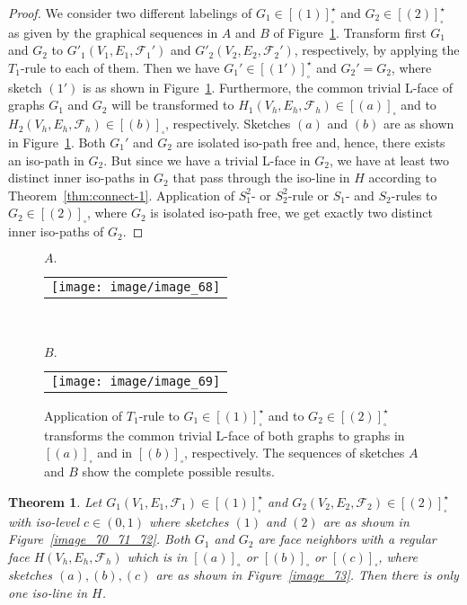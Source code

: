 \documentclass[a4paper,11pt]{article}
\newtheorem{theorem}{Theorem}[section]
\begin{document}
\begin{proof} We consider two different labelings of $G_1\in [(1)]_{\square}^{\star}$ and
$G_2\in [(2)]_{\square}^{\star}$ as given by the graphical sequences in $A$ and $B$ of
Figure~\ref{image_68_69}. Transform first $G_1$ and $G_2$ to $G'_1(V_1,E_1,\mathcal{F}_1')$ and
$G'_2(V_2,E_2,\mathcal{F}_2')$, respectively, by applying the $T_1$-rule to each of
them. Then we have $G_1'\in [(1')]_{\square}^{\star}$ and $G_2'=G_2$, where sketch $(1')$ is as
shown in Figure~\ref{image_68_69}. Furthermore, the common trivial L-face of graphs $G_1$ and
$G_2$ will be transformed to $H_1(V_h,E_h,\mathcal{F}_h)\in [(a)]_{\square}$ and
to $H_2(V_h,E_h,\mathcal{F}_h)\in [(b)]_{\square}$, respectively. Sketches
$(a)$ and $(b)$ are as shown in Figure~\ref{image_68_69}. Both $G_1'$ and $G_2$ are isolated iso-path
free and, hence, there exists an iso-path in $G_2$. But since we have a trivial L-face in $G_2$,
we have at least two distinct inner iso-paths in $G_2$ that pass through the iso-line in $H$ according
to Theorem~\ref{thm:connect-1}. Application of $S_1^2$- or $S_2^2$-rule or $S_1$- and $S_2$-rules
to $G_2\in [(2)]_{\square}$, where $G_2$ is isolated iso-path free, we get exactly two distinct inner
iso-paths of $G_2$.
\end{proof}
\begin{figure}[!ht]
\noindent $A.$
\begin{tabular}[c]{l}
\texttt{[image: image/image\_68]}
\end{tabular}
\\ \\

\noindent $B.$
\begin{tabular}[c]{l}
\texttt{[image: image/image\_69]}
\end{tabular}
\caption{Application of $T_1$-rule to $G_1\in [(1)]_{\square}^{\star}$ and to $G_2\in [(2)]_{\square}^{\star}$
transforms the common trivial L-face of both graphs to graphs in $[(a)]_{\square}$ and in $[(b)]_{\square}$,
respectively. The sequences of sketches $A$ and $B$ show the complete possible results.}
\label{image_68_69}
\end{figure}
\FloatBarrier
\begin{theorem}\label{thm:connect-2}
Let $G_1(V_1,E_1,\mathcal{F}_1)\in [(1)]_{\square}^{\star}$ and $G_2(V_2,E_2,\mathcal{F}_2)
\in [(2)]_{\square}^{\star}$ with iso-level $c\in (0,1)$ where sketches $(1)$ and $(2)$ are as
shown in Figure~\ref{image_70_71_72}. Both $G_1$ and $G_2$ are face neighbors with a regular
face $H(V_h,E_h,\mathcal{F}_h)$ which is in $[(a)]_{\circ}$ or $[(b)]_{\square}$ or
$[(c)]_{\square}$, where sketches $(a),(b),(c)$ are as shown in Figure~\ref{image_73}.
Then there is only one iso-line in $H$.
\end{theorem}
\end{document}
